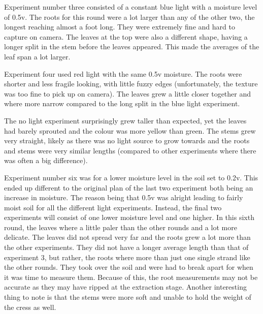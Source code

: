 Experiment number three consisted of a constant blue light with a moisture level of 0.5v. The roots for this round were a lot larger than any of the other two, the longest reaching almost a foot long. They were extremely fine and hard to capture on camera. The leaves at the top were also a different shape, having a longer split in the stem before the leaves appeared. This made the averages of the leaf span a lot larger.


Experiment four used red light with the same 0.5v moisture. The roots were shorter and less fragile looking, with little fuzzy edges (unfortunately, the texture was too fine to pick up on camera). The leaves grew a little closer together and where more narrow compared to the long split in the blue light experiment.


The no light experiment surprisingly grew taller than expected, yet the leaves had barely sprouted and the colour was more yellow than green. The stems grew very straight, likely as there was no light source to grow towards and the roots and stems were very similar lengths (compared to other experiments where there was often a big difference).


Experiment number six was for a lower moisture level in the soil set to 0.2v. This ended up different to the original plan of the last two experiment both being an increase in moisture. The reason being that 0.5v was alright leading to fairly moist soil for all the different light experiments. Instead, the final two experiments will consist of one lower moisture level and one higher. In this sixth round, the leaves where a little paler than the other rounds and a lot more delicate. The leaves did not spread very far and the roots grew a lot more than the other experiments. They did not have a longer average length than that of experiment 3, but rather, the roots where more than just one single strand like the other rounds. They took over the soil and were had to break apart for when it was time to measure them. Because of this, the root measurements may not be accurate as they may have ripped at the extraction stage. Another interesting thing to note is that the stems were more soft and unable to hold the weight of the cress as well.



